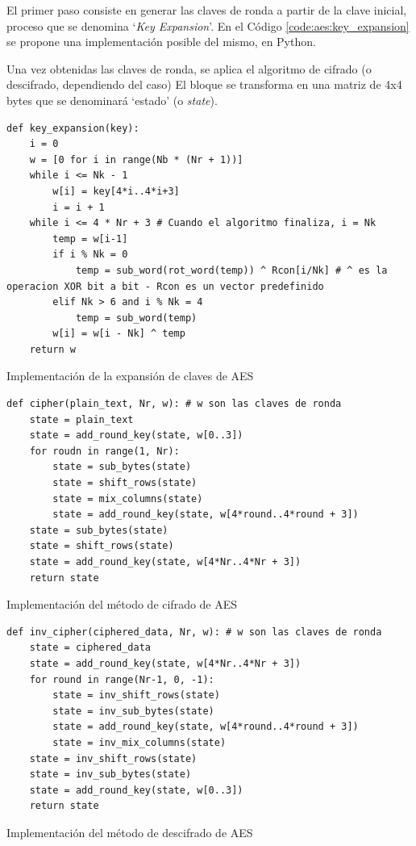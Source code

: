 \documentclass[11pt]{article}
\begin{document}
El primer paso consiste en generar las claves de ronda a partir de la clave inicial, proceso que se denomina `\textit{Key Expansion}'. En el Código \ref{code:aes:key_expansion} se propone una implementación posible del mismo, en Python.

Una vez obtenidas las claves de ronda, se aplica el algoritmo de cifrado (o descifrado, dependiendo del caso)
El bloque se transforma en una matriz de 4x4 bytes que se denominará `estado' (o \textit{state}). 

\begin{listing}[h]
\begin{verbatim}
def key_expansion(key):
    i = 0
    w = [0 for i in range(Nb * (Nr + 1))]
    while i <= Nk - 1
        w[i] = key[4*i..4*i+3]
        i = i + 1
    while i <= 4 * Nr + 3 # Cuando el algoritmo finaliza, i = Nk
        temp = w[i-1]
        if i % Nk = 0
            temp = sub_word(rot_word(temp)) ^ Rcon[i/Nk] # ^ es la operacion XOR bit a bit - Rcon es un vector predefinido
        elif Nk > 6 and i % Nk = 4
            temp = sub_word(temp)
        w[i] = w[i - Nk] ^ temp
    return w
\end{verbatim}
\caption{Implementación de la expansión de claves de AES}
\label{code:aes:key_expansion}
\end{listing}

\begin{listing}[h]
\begin{verbatim}
def cipher(plain_text, Nr, w): # w son las claves de ronda
    state = plain_text
    state = add_round_key(state, w[0..3])
    for roudn in range(1, Nr):
        state = sub_bytes(state)
        state = shift_rows(state)
        state = mix_columns(state)
        state = add_round_key(state, w[4*round..4*round + 3])
    state = sub_bytes(state)
    state = shift_rows(state)
    state = add_round_key(state, w[4*Nr..4*Nr + 3])
    return state
\end{verbatim}
\caption{Implementación del método de cifrado de AES}
\label{code:aes:cipher}
\end{listing}

\begin{listing}[h]
\begin{verbatim}
def inv_cipher(ciphered_data, Nr, w): # w son las claves de ronda
    state = ciphered_data
    state = add_round_key(state, w[4*Nr..4*Nr + 3])
    for round in range(Nr-1, 0, -1):
        state = inv_shift_rows(state)
        state = inv_sub_bytes(state)
        state = add_round_key(state, w[4*round..4*round + 3])
        state = inv_mix_columns(state)
    state = inv_shift_rows(state)
    state = inv_sub_bytes(state)
    state = add_round_key(state, w[0..3])
    return state
\end{verbatim}
\caption{Implementación del método de descifrado de AES}
\label{code:aes:inv_cipher}
\end{listing}
\end{document}
